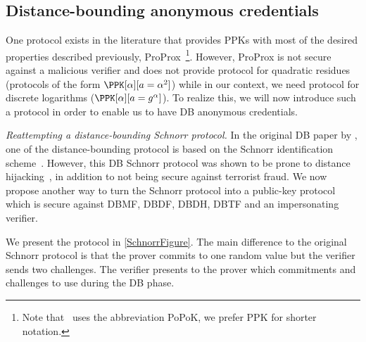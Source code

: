 \subsection{Distance-bounding anonymous credentials}%
\label{DB-anon-cred}

One protocol exists in the literature that provides \acp{PPK} with most of the 
desired properties described previously, ProProx~\cite{ProProx}\footnote{Note 
  that~\cite{ProProx} uses the abbreviation PoPoK, we prefer \acs{PPK} for 
  shorter notation.}.
However, ProProx is not secure against a malicious verifier and does
not  provide  protocol for quadratic residues (\ie protocols of the form \(\PPK[\alpha][a = \alpha^2]\)) while in our context, we need  protocol for discrete logarithms (\ie \(\PPK[\alpha][a = g^\alpha]\)).
To realize this, we will now introduce such a protocol in order to enable us to have \ac{DB} anonymous credentials.


\emph{Reattempting a distance-bounding Schnorr protocol.}%
\label{DBSchnorr}
In the original \ac{DB} paper by \citet{DistanceBounding}, one of the distance-bounding protocol is based on the Schnorr identification scheme~\cite{Schnorr}.
However, this \ac{DB} Schnorr protocol was shown to be prone to distance hijacking~\cite{DistanceHijacking}, in addition to not being secure against terrorist fraud.
We now propose another way to turn the Schnorr protocol into a
public-key  protocol which is secure against \ac{DBMF},
\ac{DBDF}, \ac{DBDH}, \ac{DBTF} and an impersonating
verifier. 

We present the protocol in \cref{SchnorrFigure}.
The main difference to the original Schnorr protocol is that the prover commits to one random value but the verifier sends two challenges.
The verifier presents to the prover which commitments and challenges to use during the \ac{DB} phase.

